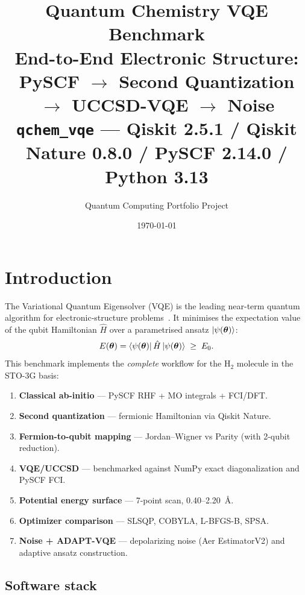 \documentclass[11pt,a4paper]{article}
\title{\textbf{\Large Quantum Chemistry VQE Benchmark}\\[4pt]
  \large End-to-End Electronic Structure: PySCF $\to$ Second Quantization
  $\to$ UCCSD-VQE $\to$ Noise\\[2pt]
  \normalsize\texttt{qchem\_vqe} --- Qiskit 2.5.1 / Qiskit Nature 0.8.0 /
  PySCF 2.14.0 / Python 3.13}
\author{Quantum Computing Portfolio Project}
\date{\today}
\begin{document}
\maketitle\tableofcontents\newpage

\section{Introduction}

The Variational Quantum Eigensolver (VQE) is the leading near-term quantum
algorithm for electronic-structure problems~\cite{peruzzo2014}. It minimises
the expectation value of the qubit Hamiltonian $\hat{H}$ over a parametrised
ansatz $\ket{\psi(\boldsymbol\theta)}$:
\begin{equation}
  E(\boldsymbol\theta) = \bra{\psi(\boldsymbol\theta)}\hat{H}\ket{\psi(\boldsymbol\theta)}
  \;\geq\; E_0.
  \label{eq:vqe}
\end{equation}
This benchmark implements the \emph{complete} workflow for the H$_2$ molecule
in the STO-3G basis:

\begin{enumerate}
  \item \textbf{Classical ab-initio} --- PySCF RHF + MO integrals + FCI/DFT.
  \item \textbf{Second quantization} --- fermionic Hamiltonian via Qiskit Nature.
  \item \textbf{Fermion-to-qubit mapping} --- Jordan--Wigner vs Parity (with 2-qubit reduction).
  \item \textbf{VQE/UCCSD} --- benchmarked against NumPy exact diagonalization and PySCF FCI.
  \item \textbf{Potential energy surface} --- 7-point scan, 0.40--2.20~\AA.
  \item \textbf{Optimizer comparison} --- SLSQP, COBYLA, L-BFGS-B, SPSA.
  \item \textbf{Noise + ADAPT-VQE} --- depolarizing noise (Aer EstimatorV2) and
        adaptive ansatz construction.
\end{enumerate}

\subsection*{Software stack}
\end{document}
